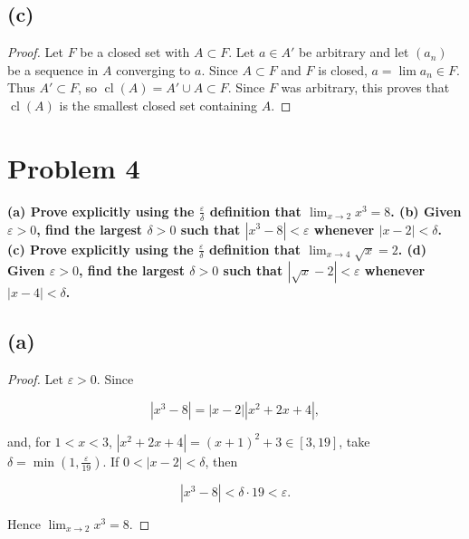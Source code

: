\subsection{(c)}

\begin{proof}

Let \(F\) be a closed set with \(A \subset F\). Let \(a \in A'\) be arbitrary and let \(\left( a_{n} \right)\) be a sequence in \(A\) converging to \(a\). Since \(A \subset F\) and \(F\) is closed, \(a = \lim a_{n} \in F\). Thus \(A' \subset F\), so \(\operatorname{cl}(A) = A' \cup A \subset F\). Since \(F\) was arbitrary, this proves that \(\operatorname{cl}(A)\) is the smallest closed set containing \(A\).

\end{proof}

\section{Problem 4}

\textbf{(a) Prove explicitly using the \(\frac{\varepsilon}{\delta}\) definition that \(\lim_{x\rightarrow 2}x^{3} = 8\). (b) Given \(\varepsilon > 0\), find the largest \(\delta > 0\) such that \(\left| {x^{3} - 8} \right| < \varepsilon\) whenever \(\left| {x - 2} \right| < \delta\). (c) Prove explicitly using the \(\frac{\varepsilon}{\delta}\) definition that \(\lim_{x\rightarrow 4}\sqrt{x} = 2\). (d) Given \(\varepsilon > 0\), find the largest \(\delta > 0\) such that \(\left| {\sqrt{x} - 2} \right| < \varepsilon\) whenever \(\left| {x - 4} \right| < \delta\).}

\subsection{(a)}

\begin{proof}

Let \(\varepsilon > 0\). Since

\[\left| {x^{3} - 8} \right| = \left| {x - 2} \right|\left| {x^{2} + 2x + 4} \right|,\]

and, for \(1 < x < 3\), \(\left| {x^{2} + 2x + 4} \right| = \left( {x + 1} \right)^{2} + 3 \in \left\lbrack {3,19} \right\rbrack\), take \(\delta = \min\left( {1,\frac{\varepsilon}{19}} \right)\). If \(0 < \left| {x - 2} \right| < \delta\), then

\[\left| {x^{3} - 8} \right| < \delta \cdot 19 < \varepsilon.\]

Hence \(\lim_{x\rightarrow 2}x^{3} = 8\).

\end{proof}

